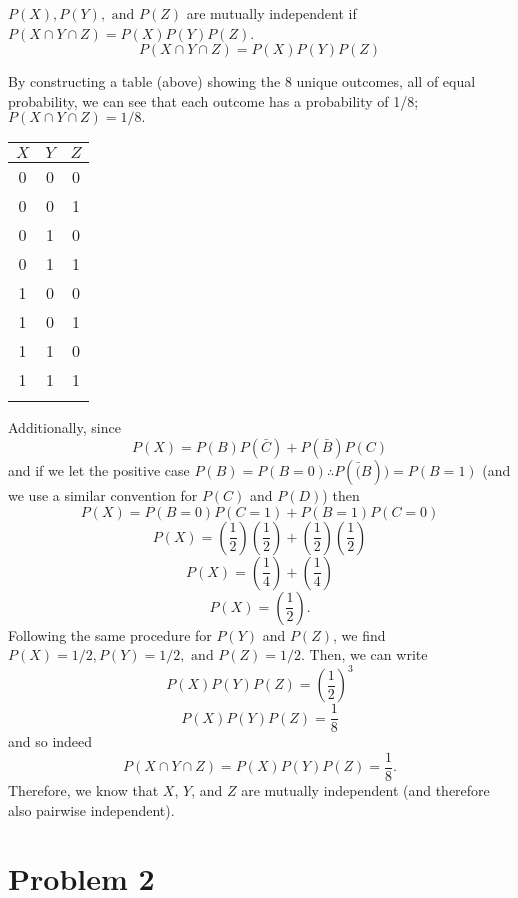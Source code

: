 \documentclass{report}
\begin{document}
$P(X),P(Y),\text{ and }P(Z)$ are mutually independent if $P(X \cap Y \cap Z) = P(X)P(Y)P(Z)$.
$$ P(X \cap Y \cap Z) = P(X)P(Y)P(Z) $$

By constructing a table (above) showing the 8 unique outcomes, all of equal probability, we can see that each outcome has a probability of 1/8; $P(X \cap Y \cap Z) = 1/8. $
\begin{table}[htbp]
	\centering
	\begin{tabular}{ccc}
		$X$  & $Y$ & $Z$ \\
		\midrule
		0 & 0 & 0 \\
		0 & 0 & 1 \\
		0 & 1 & 0 \\
		0 & 1 & 1 \\
		1 & 0 & 0 \\
		1 & 0 & 1 \\
		1 & 1 & 0 \\
		1 & 1 & 1 \\
		\\
	\end{tabular}%
\end{table}%

Additionally, since
$$ P(X) = P(B)P(\bar{C}) + P(\bar{B})P(C) $$
and if we let the positive case $P(B) = P(B=0) \therefore P(\bar(B)) = P(B=1)$ (and we use a similar convention for $P(C)$ and $P(D)$) then
$$ P(X) = P(B=0)P(C=1) + P(B=1)P(C=0) $$
$$ P(X) = \left(\frac{1}{2}\right)\left(\frac{1}{2}\right) + \left(\frac{1}{2}\right)\left(\frac{1}{2}\right) $$
$$ P(X) = \left(\frac{1}{4}\right) + \left(\frac{1}{4}\right) $$
$$ P(X) = \left(\frac{1}{2}\right). $$
Following the same procedure for $P(Y)$ and $P(Z)$, we find $P(X) = 1/2, P(Y) = 1/2, \text{ and } P(Z) = 1/2$. Then, we can write
$$ P(X)P(Y)P(Z) = \left(\frac{1}{2}\right)^3 $$
$$ P(X)P(Y)P(Z) = \frac{1}{8} $$
and so indeed
$$ P(X \cap Y \cap Z) = P(X)P(Y)P(Z) = \frac{1}{8}. $$
Therefore, we know that $X$, $Y$, and $Z$ are mutually independent (and therefore also pairwise independent). 



\newpage
\section*{Problem 2}
\end{document}
